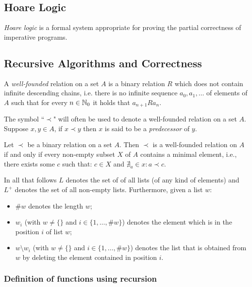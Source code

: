\subsection{Hoare Logic}
\emph{Hoare logic} is a formal system appropriate for proving the partial correctness of imperative programs.


\subsection{Recursive Algorithms and Correctness}

\begin{definition}
	A \emph{well-founded} relation on a set $A$ is a binary relation $R$ which does not contain infinite descending chains, i.e. there is no infinite sequence $a_0, a_1, \ldots$ of elements of $A$ such that for every $n \in \mathbb{N}_0$ it holds that $a_{n+1}Ra_n$.
\end{definition}

The symbol ``$\prec$" will often be used to denote a well-founded relation on a set $A$. Suppose $x,y \in A$, if $x \prec y$ then $x$ is said to be a \emph{predecessor} of $y$. 

\begin{theorem}
	Let $\prec$ be a binary relation on a set $A$. Then $\prec$ is a well-founded relation on $A$ if and only if every non-empty subset $X$ of $A$ contains a minimal element, i.e., there exists some $c$ such that: $c \in X$ and $\nexists_a \in x : a \prec c$.
\end{theorem}

In all that follows $L$ denotes the set of of all lists (of any kind of elements) and $L^+$ denotes the set of all non-empty lists. Furthermore, given a list $w$:
\begin{itemize}
	\item $\# w$ denotes the length $w$;
	\item $w_i$ (with $w \neq \{ \}$ and $i \in \{ 1, \ldots, \# w \}$) denotes the element which is in the position $i$ of list $w$;
	\item $w \setminus w_i$ (with $w \neq \{ \}$ and $i \in \{ 1, \ldots, \# w \}$) denotes the list that is obtained from $w$ by deleting the element contained in position $i$.
\end{itemize}

\subsubsection*{Definition of functions using recursion}

